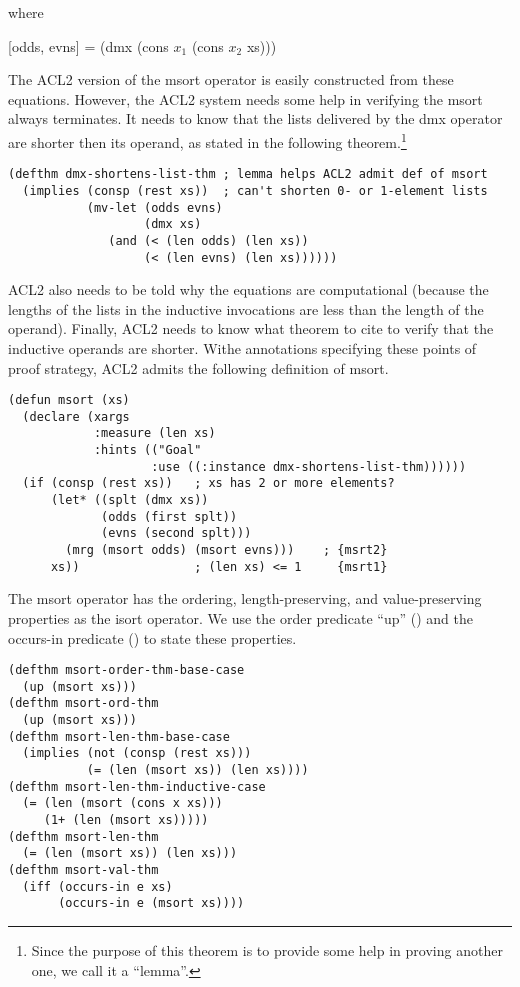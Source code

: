 \hspace{1.2cm} where

\hspace{1.2cm} [odds, evns] = (dmx (cons $x_1$ (cons $x_2$ xs)))

The ACL2 version of the msort operator is easily
constructed from these equations.
However, the ACL2 system needs some help in verifying
the msort always terminates. It needs to know
that the lists delivered by the dmx operator are shorter
then its operand, as stated in the following theorem.\footnote{Since
the purpose of this theorem is to provide some help in proving
another one, we call it a ``lemma''.}

\label{defthm:dmx-shortens-list}
\begin{Verbatim}
(defthm dmx-shortens-list-thm ; lemma helps ACL2 admit def of msort
  (implies (consp (rest xs))  ; can't shorten 0- or 1-element lists
           (mv-let (odds evns)
                   (dmx xs)
              (and (< (len odds) (len xs))
                   (< (len evns) (len xs))))))
\end{Verbatim}

ACL2 also needs to be told why the equations are computational
(because the lengths of the lists in the inductive invocations
are less than the length of the operand).
Finally, ACL2 needs to know what theorem to cite to verify
that the inductive operands are shorter.
Withe annotations specifying these points of proof strategy,
ACL2 admits the following definition of msort.

\label{defun:msort}
\begin{Verbatim}
(defun msort (xs)
  (declare (xargs
            :measure (len xs)
            :hints (("Goal"
                    :use ((:instance dmx-shortens-list-thm))))))
  (if (consp (rest xs))   ; xs has 2 or more elements?
      (let* ((splt (dmx xs))
             (odds (first splt))
             (evns (second splt)))
        (mrg (msort odds) (msort evns)))    ; {msrt2}
      xs))                ; (len xs) <= 1     {msrt1}
\end{Verbatim}

The msort operator has the ordering, length-preserving,
and value-preserving properties as the isort operator.
We use the order predicate ``up'' (\pageref{defun:up})
and the occurs-in predicate (\pageref{def:occurs-in})
to state these properties.

\label{defthm:msort-ord}
\label{defthm:msort-len}
\label{defthm:msort-val}
\begin{Verbatim}
(defthm msort-order-thm-base-case
  (up (msort xs)))
(defthm msort-ord-thm
  (up (msort xs)))
(defthm msort-len-thm-base-case
  (implies (not (consp (rest xs)))
           (= (len (msort xs)) (len xs))))
(defthm msort-len-thm-inductive-case
  (= (len (msort (cons x xs)))
     (1+ (len (msort xs)))))
(defthm msort-len-thm
  (= (len (msort xs)) (len xs)))
(defthm msort-val-thm
  (iff (occurs-in e xs)
       (occurs-in e (msort xs))))
\end{Verbatim}

